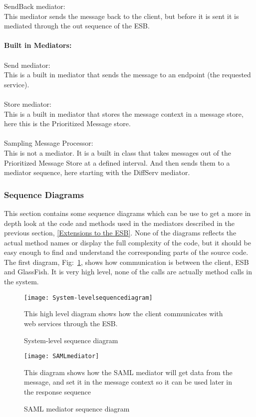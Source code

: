 SendBack mediator:\\
    This mediator sends the message back to the client, but before it is sent it is mediated through the out sequence of the ESB.
\\\\
\textbf{Built in Mediators:}\\\\
Send mediator:\\
    This is a built in mediator that sends the message to an endpoint (the requested service).
\\\\
Store mediator:\\
    This is a built in mediator that stores the message context in a message store, here this is the Prioritized Message store.
\\\\
Sampling Message Processor:\\
    This is not a mediator. It is a built in class that takes messages out of the Prioritized Message Store at a defined interval. And then sends them to a mediator sequence, here starting with the DiffServ mediator.

    \subsubsection{Sequence Diagrams}\label{Server Sequence Diagrams}
    This section contains some sequence diagrams which can be use to get a more in depth look at the code and methods used in the mediators described in the previous section, \ref{Extensions to the ESB}. None of the diagrams reflects the actual method names or display the full complexity of the code, but it should be easy enough to find and understand the corresponding parts of the source code. The first diagram, Fig:~\ref{fig:System-levelsequencediagram}, shows how communication is between the client, ESB and GlassFish. It is very high level, none of the calls are actually method calls in the system.
    
        \begin{figure}[H]
            \centering
            \texttt{[image: System-levelsequencediagram]}
            \caption{System-level sequence diagram}
            This high level diagram shows how the client communicates with web services through the ESB.
            \label{fig:System-levelsequencediagram}
        \end{figure}
        
        \begin{figure}[H] 
            \centering
            \texttt{[image: SAMLmediator]}
            \caption{SAML mediator sequence diagram}
            This diagram shows how the SAML mediator will get data from the message, and set it in the message context so it can be used later in the response sequence
            \label{fig:SAMLmediator}
        \end{figure}
        
